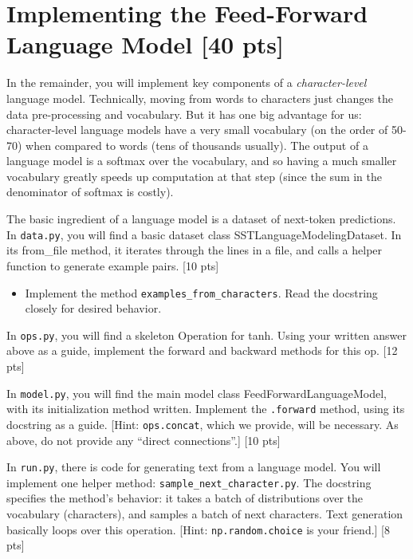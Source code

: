 \documentclass[11pt]{article}
\begin{document}
\section{Implementing the Feed-Forward Language Model [40 pts]}

In the remainder, you will implement key components of a \emph{character-level} language model.  Technically, moving from words to characters just changes the data pre-processing and vocabulary.  But it has one big advantage for us: character-level language models have a very small vocabulary (on the order of 50-70) when compared to words (tens of thousands usually).  The output of a language model is a softmax over the vocabulary, and so having a much smaller vocabulary greatly speeds up computation at that step (since the sum in the denominator of softmax is costly).

\vspace{2em}
 The basic ingredient of a language model is a dataset of next-token predictions. In \texttt{data.py}, you will find a basic dataset class SSTLanguageModelingDataset.  In its from\_file method, it iterates through the lines in a file, and calls a helper function to generate example pairs. \hfill [10 pts]
\begin{itemize}
  \item Implement the method \texttt{examples\_from\_characters}.  Read the docstring closely for desired behavior.
\end{itemize}

\vspace{2em}
  In \texttt{ops.py}, you will find a skeleton Operation for tanh.  Using your written answer above as a guide, implement the forward and backward methods for this op. \hfill [12 pts]

\vspace{2em}
 In \texttt{model.py}, you will find the main model class FeedForwardLanguageModel, with its initialization method written.  Implement the \texttt{.forward} method, using its docstring as a guide.  [Hint: \texttt{ops.concat}, which we provide, will be necessary.  As above, do not provide any ``direct connections''.] \hfill [10 pts]

\vspace{2em}
  In \texttt{run.py}, there is code for generating text from a language model.  You will implement one helper method: \texttt{sample\_next\_character.py}.  The docstring specifies the method's behavior: it takes a batch of distributions over the vocabulary (characters), and samples a batch of next characters.  Text generation basically loops over this operation. [Hint: \texttt{np.random.choice} is your friend.] \hfill [8 pts]
\end{document}
